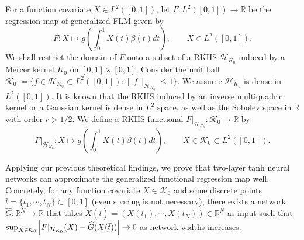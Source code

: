 \documentclass{article}
\def\RR{\mathbb R}
\numberwithin{equation}{section}
\begin{document}
For a function covariate $X\in L^2([0,1])$, let $F:L^2([0,1]) \to \RR$ be the regression map of generalized FLM given by
\begin{equation}\label{func_gflm}
    F: X \mapsto g\left(\int_0^1 X(t) \beta(t) dt\right), \qquad X\in L^2([0,1]).
\end{equation}   
We shall restrict the domain of $F$ onto a subset of  a RKHS $\mathcal{H}_{K_0}$ induced by a Mercer kernel $K_0$ on $[0,1] \times [0,1]$.
Consider the unit ball $\mathcal{K}_0 := \{f\in \mathcal{H}_{K_0} \subset L^2([0,1]): \|f\|_{\mathcal{H}_{K_0}} \leq 1\}$. 
We assume $\mathcal{H}_{K_0}$ is dense in $L^2([0,1])$.
It is known that the RKHS induced by an inverse multiquadric kernel or a Gaussian kernel is dense in $L^2$ space, as well as the Sobolev space in $\RR$ with order $r>1/2$. 
We define a RKHS functional 
$F|_{\mathcal{H}_{K_0}}:\mathcal{K}_0 \to \RR$ by 
\begin{equation}\label{regmap}
    F|_{\mathcal{H}_{K_0}}: X \mapsto g\left(\int_0^1 X(t) \beta(t) dt\right), \qquad X\in \mathcal{K}_0 \subset L^2([0,1]).
\end{equation}
 


 
Applying our previous theoretical findings, we prove that two-layer tanh neural networks can approximate the generalized functional regression map well. Concretely, for any function covariate $X\in \mathcal{K}_0$ and some discrete points  $\bar{t} = \{t_1, \cdots, t_N\}\subset [0,1]$ (even spacing is not necessary), there exists a network $\widehat G:\RR^N \to \RR$ that takes $X(\bar{t})=(X(t_1), \cdots, X(t_N))\in\RR^N$ as input such that 
$\sup_{X\in \mathcal{K}_0}\left|F|_{\mathcal{H}_{K_0}}(X) - \widehat{G}(X(\Bar{t}))\right| \to 0$  as network widths increases.
\end{document}
